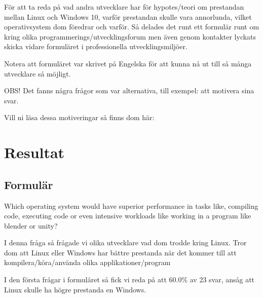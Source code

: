 \documentclass[12pt, a4paper]{report}
\begin{document}
   För att ta reda på vad andra utvecklare har för hypotes/teori om prestandan mellan Linux och Windows 10, varför prestandan skulle vara annorlunda, vilket operativsystem dom föredrar och varför. Så delades det runt ett formulär runt om kring olika programmerings/utvecklingsforum men även genom kontakter lyckats skicka vidare formuläret i professionella utvecklingsmiljöer.
 
   Notera att formuläret var skrivet på Engelska för att kunna nå ut till så många utvecklare så möjligt.
    
   \vspace{1cm}
 
 
   \small{OBS! Det fanns några frågor som var alternativa, till exempel: att motivera sina svar.
  
   Vill ni läsa dessa motiveringar så finns dom här:} 
 
\vspace{1cm}
\section{Resultat}

    \subsection{Formulär}   \label{form}

\large {Which operating system would have superior performance in tasks like, compiling code, executing code or even intensive workloads like working in a program  like blender or unity?}
 
   \vspace{.5cm}
 
   \normalsize I denna fråga så frågade vi olika utvecklare vad dom trodde kring Linux. Tror dom att Linux eller Windows har bättre prestanda när det kommer till att kompilera/köra/använda olika applikationer/program
 
 
   \vspace{1cm}
 
 
   \cite{form}


   I den första frågar i formuläret så fick vi reda på att 60.0\% av 23 svar, ansåg att Linux skulle ha högre prestanda en Windows.
\end{document}

